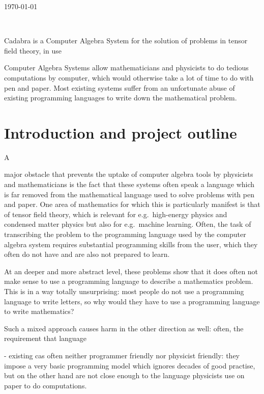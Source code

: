 \documentclass[11pt]{article}
\begin{document}
\begin{flushright}
\today
\end{flushright}

\\[1ex]
\vspace{2cm}


Cadabra is a Computer Algebra System for the solution of problems in
tensor field theory, in use

Computer Algebra Systems allow mathematicians and physicists to do
tedious computations by computer, which would otherwise take a lot of
time to do with pen and paper. Most existing systems suffer from an
unfortunate abuse of existing programming languages to write down the
mathematical problem. 


\section{Introduction and project outline}A

 major obstacle that prevents the uptake of computer algebra tools by
physicists and mathematicians is the fact that these systems often
speak a language which is far removed from the mathematical language
used to solve problems with pen and paper. One area of mathematics for
which this is particularly manifest is that of tensor field theory,
which is relevant for e.g.~high-energy physics and condensed matter
physics but also for e.g.~machine learning. Often, the task of
transcribing the problem to the programming language used by the
computer algebra system requires substantial programming skills from
the user, which they often do not have and are also not prepared to
learn.

At an deeper and more abstract level, these problems show that it does
often not make sense to use a programming language to describe a
mathematics problem. This is in a way totally unsurprising: most
people do not use a programming language to write letters, so why
would they have to use a programming language to write mathematics?

Such a mixed approach causes harm in the other direction as well:
often, the requirement that language


   - existing cas often neither programmer friendly nor physicist
     friendly: they impose a very basic programming model which
     ignores decades of good practise, but on the other hand are
     not close enough to the language physicists use on paper to do
     computations.
\end{document}
